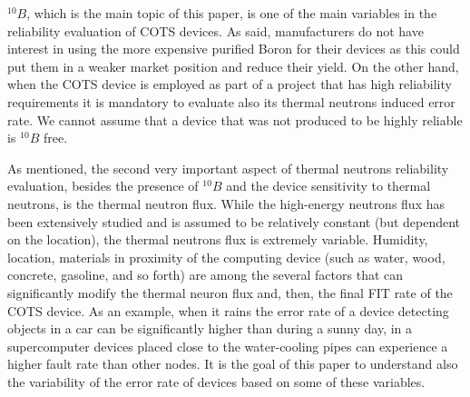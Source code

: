 $^{10}B$, which is the main topic of this paper, is one of the main variables in the reliability evaluation of COTS devices. As said, manufacturers do not have interest in using the more expensive purified Boron for their devices as this could put them in a weaker market position and reduce their yield. On the other hand, when the COTS device is employed as part of a project that has high reliability requirements it is mandatory to evaluate also its thermal neutrons induced error rate. We cannot assume that a device that was not produced to be highly reliable is $^{10}B$ free.

As mentioned, the second very important aspect of thermal neutrons reliability evaluation, besides the presence of $^{10}B$ and the device sensitivity to thermal neutrons, is the thermal neutron flux. While the high-energy neutrons flux has been extensively studied and is assumed to be relatively constant (but dependent on the location), the thermal neutrons flux is extremely variable. Humidity, location, materials in proximity of the computing device (such as water, wood, concrete, gasoline, and so forth) are among the several factors that can significantly modify the thermal neuron flux and, then, the final FIT rate of the COTS device. As an example, when it rains the error rate of a device detecting objects in a car can be significantly higher than during a sunny day, in a supercomputer devices placed close to the water-cooling pipes can experience a higher fault rate than other nodes. It is the goal of this paper to understand also the variability of the error rate of devices based on some of these variables.



